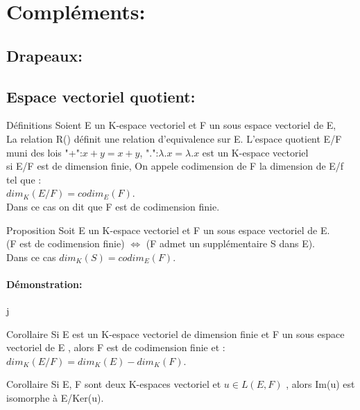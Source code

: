 \documentclass{book}
\begin{document}
\section{Compléments:}
\subsection{Drapeaux:}
\subsection{Espace vectoriel quotient:}
\begin{Définition}[]{Définitions}{}
Soient E un K-espace vectoriel et F un sous espace vectoriel de E,
\\
La relation R() définit une relation d'equivalence sur E.
L'espace quotient E/F muni des lois "+":\(x+y=x+y\), ".":\(\lambda.x=\lambda.x\)
est un K-espace vectoriel
\\
si E/F est de dimension finie, On appele codimension de F la dimension de E/f tel que :
\\ \(dim_{K}(E/F)=codim_{E}(F)\).
\\ Dans ce cas on dit que F est de codimension finie.
\end{Définition}
\begin{Propriété}[]{Proposition}{}
Soit E un K-espace vectoriel et F un sous espace vectoriel de E.
\\ (F est de codimension finie) \(\Leftrightarrow\) (F admet un supplémentaire S dans E).
\\ Dans ce cas \(dim_{K}(S)=codim_{E}(F)\).
\end{Propriété}
\paragraph{Démonstration:}
j
\begin{Propriété}[]{Corollaire}{}
Si E est un K-espace vectoriel de dimension finie et F un sous espace vectoriel de E , alors F est de codimension finie et :
 \\ \(dim_{K}(E/F)=dim_{K}(E)-dim_{K}(F)\).
 \end{Propriété}
\begin{Propriété}[]{Corollaire}{}
Si E, F sont deux K-espaces vectoriel et \(u \in L(E,F)\) , alors Im(u) est isomorphe à E/Ker(u). 
 \end{Propriété}
\end{document}
